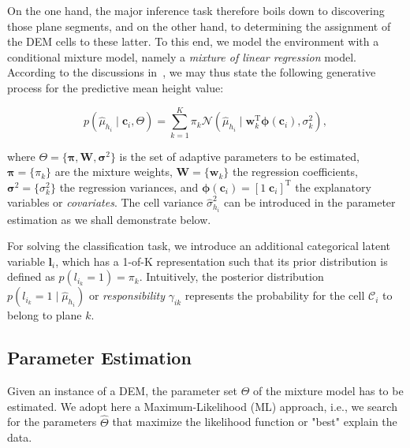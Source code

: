 On the one hand, the major inference task therefore boils down to discovering
those plane segments, and on the other hand, to determining the assignment of
the DEM cells to these latter. To this end, we model the environment with a
conditional mixture model, namely a \emph{mixture of linear regression} model.
According to the discussions in~\cite{bishop06pattern}, we may thus state the
following generative process for the predictive mean height value:

\begin{equation}
\label{eqn:mixture}
p(\hat{\mu}_{h_i}\mid\mathbf{c}_i, \Theta)=\sum_{k=1}^K\pi_k\mathcal{N}
(\hat{\mu}_{h_i}\mid\mathbf{w}_k^\text{T}\boldsymbol{\phi}(\mathbf{c}_i),
\sigma^2_k),
\end{equation}

where $\Theta=\{\boldsymbol{\pi},\mathbf{W},\boldsymbol{\sigma}^2\}$ is the set
of adaptive parameters to be estimated, $\boldsymbol{\pi}=\{\pi_k\}$ are the
mixture weights, $\mathbf{W}=\{\mathbf{w}_k\}$ the regression coefficients,
$\boldsymbol{\sigma}^2=\{\sigma^2_k\}$ the regression variances, and
$\boldsymbol{\phi}(\mathbf{c}_i)=[1\;\mathbf{c}_i]^\text{T}$ the explanatory
variables or \emph{covariates}. The cell variance $\hat{\sigma}^2_{h_i}$ can
be introduced in the parameter estimation as we shall demonstrate below.

For solving the classification task, we introduce an additional categorical
latent variable $\mathbf{l}_i$, which has a 1-of-K representation such that
its prior distribution is defined as $p(l_{i_k}=1)=\pi_k$. Intuitively, the
posterior distribution $p(l_{i_k}=1\mid\hat{\mu}_{h_i})$ or
\emph{responsibility} $\gamma_{ik}$ represents the probability for the cell
$\mathcal{C}_i$ to belong to plane $k$.

\subsection{Parameter Estimation}

Given an instance of a DEM, the parameter set $\Theta$ of the mixture model has
to be estimated. We adopt here a Maximum-Likelihood (ML) approach, i.e., we
search for the parameters $\hat{\Theta}$ that maximize the likelihood function
or "best" explain the data.

